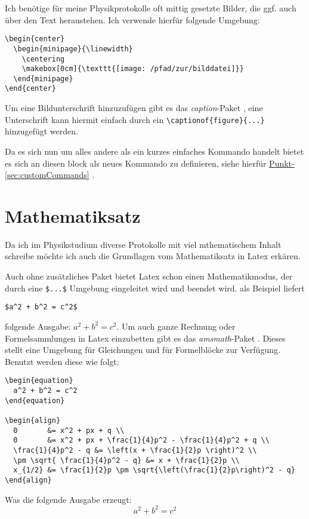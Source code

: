 \documentclass[a4paper, parskip=half]{scrartcl}
\newcommand{\mySecRef}[1]{%
  \hyperref[sec:#1]{Punkt-}\ref{sec:#1}%
}
\newcommand{\myPackage}[1]{%
  \textit{#1}-Paket%
}
\begin{document}
Ich benötige für meine Physikprotokolle oft mittig gesetzte Bilder, die ggf. auch über den Text heraustehen.
Ich verwende hierfür folgende Umgebung:
\begin{verbatim}
\begin{center}
  \begin{minipage}{\linewidth}
    \centering
    \makebox[0cm]{\texttt{[image: /pfad/zur/bilddatei]}}
  \end{minipage}
\end{center}
\end{verbatim}

Um eine Bildunterschrift hinzuzufügen gibt es das \myPackage{caption}, eine Unterschrift kann hiermit einfach
durch ein \verb+\captionof{figure}{...}+ hinzugefügt werden.

Da es sich nun um alles andere als ein kurzes einfaches Kommando handelt bietet es sich an diesen block als neues
Kommando zu definieren, siehe hierfür \mySecRef{customCommands}.
\section{Mathematiksatz}
Da ich im Physikstudium diverse Protokolle mit viel mthematischem Inhalt schreibe möchte ich auch die
Grundlagen vom Mathematiksatz in Latex erkären.

Auch ohne zusätzliches Paket bietet Latex schon einen Mathematikmodus, der durch eine \verb+$...$+
Umgebung eingeleitet wird und beendet wird. als Beispiel liefert
\begin{verbatim}
$a^2 + b^2 = c^2$
\end{verbatim}
folgende Ausgabe:
$a^2 + b^2 = c^2$. Um auch ganze Rechnung oder Formelsammlungen in Latex einzubetten gibt es das
\myPackage{amsmath}. Dieses stellt eine Umgebung für Gleichungen und für Formelblöcke zur Verfügung.
Benutzt werden diese wie folgt:
\begin{verbatim}
\begin{equation}
  a^2 + b^2 = c^2
\end{equation}

\begin{align}
  0       &= x^2 + px + q \\
  0       &= x^2 + px + \frac{1}{4}p^2 - \frac{1}{4}p^2 + q \\
  \frac{1}{4}p^2 - q &= \left(x + \frac{1}{2}p \right)^2 \\
  \pm \sqrt{ \frac{1}{4}p^2 - q} &= x + \frac{1}{2}p \\
  x_{1/2} &= \frac{1}{2}p \pm \sqrt{\left(\frac{1}{2}p\right)^2 - q}  
\end{align}
\end{verbatim}
Was die folgende Ausgabe erzeugt:
\begin{equation}
  a^2 + b^2 = c^2
\end{equation}
\end{document}
